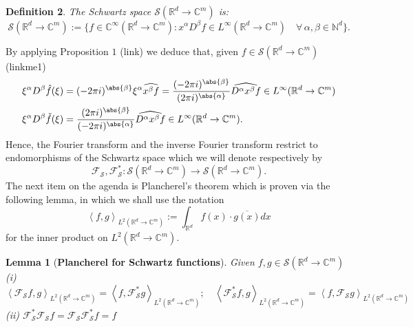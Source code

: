 \documentclass[
]{article}
\begin{document}
\leavevmode{}%
\textbf{Definition 2}. \emph{The \emph{Schwartz space}
\(\mathcal{S}({\mathbb R}^d\to\mathbb{C}^m)\) is:
\[\mathcal{S}({\mathbb R}^d\to\mathbb{C}^m):=\lbrace f\in\mathbb{C}^\infty({\mathbb R}^d\to\mathbb{C}^m):x^\alpha D^\beta f\in L^\infty({\mathbb R}^d\to\mathbb{C}^m)\quad\forall\hspace{2pt}\alpha,\beta\in \mathbb{N}^d\rbrace.\]}

By applying Proposition \(1\) (link) we deduce that, given
\(f\in\mathcal{S}({\mathbb R}^d\to\mathbb{C}^m)\) (linkme1)
\[\begin{aligned}
\label{rdft}
    \xi^\alpha D^\beta \hat{f}(\xi)   & =(-2\pi i)^{\abs{\beta}}\xi^{\alpha}\widehat{x^{\beta}f}=\frac{(-2\pi i)^{\abs{\beta}}}{(2\pi i)^{\abs{\alpha}}}\widehat{D^{\alpha}x^{\beta}f}\in L^\infty({\mathbb R}^d\to\mathbb{C}^m) \\
    \xi^\alpha D^\beta \check{f}(\xi) & =\frac{(2\pi i)^{\abs{\beta}}}{(-2\pi i)^{\abs{\alpha}}}\widehat{D^{\alpha}x^{\beta}f}\in L^\infty({\mathbb R}^d\to\mathbb{C}^m).\end{aligned}\]
Hence, the Fourier transform and the inverse Fourier transform restrict
to endomorphisms of the Schwartz space which we will denote respectively
by
\[\mathcal{F}_\mathcal{S},\mathcal{F}^*_\mathcal{S}:\mathcal{S}({\mathbb R}^d\to\mathbb{C}^m)\to\mathcal{S}({\mathbb R}^d\to\mathbb{C}^m).\]
The next item on the agenda is Plancherel's theorem which is proven via
the following lemma, in which we shall use the
notation\[\left\langle f,g\right\rangle_{L^2({\mathbb R}^d\to\mathbb{C}^m)}:=\int_{{\mathbb R}^d}f(x)\cdot  \overline{g(x)} dx\]
for the inner product on \(L^2({\mathbb R}^d\to\mathbb{C}^m)\).

\leavevmode{}%
\textbf{Lemma 1} (\textbf{Plancherel for Schwartz functions}).
\emph{Given \(f,g\in \mathcal{S}({\mathbb R}^d\to\mathbb{C}^m)\) (i)
\(\left\langle\mathcal{F}_\mathcal{S}f,g\right\rangle_{L^2({\mathbb R}^d\to\mathbb{C}^m)}=\left\langle f,\mathcal{F}_\mathcal{S}^*g\right\rangle_{L^2({\mathbb R}^d\to\mathbb{C}^m)};\quad\left\langle\mathcal{F}_\mathcal{S}^*f,g\right\rangle_{L^2({\mathbb R}^d\to\mathbb{C}^m)}=\left\langle f,\mathcal{F}_\mathcal{S}g\right\rangle_{L^2({\mathbb R}^d\to\mathbb{C}^m)}\)
(ii)
\(\mathcal{F}_\mathcal{S}^*\mathcal{F}_\mathcal{S}f=\mathcal{F}_\mathcal{S}\mathcal{F}_\mathcal{S}^*f=f\)}
\end{document}
